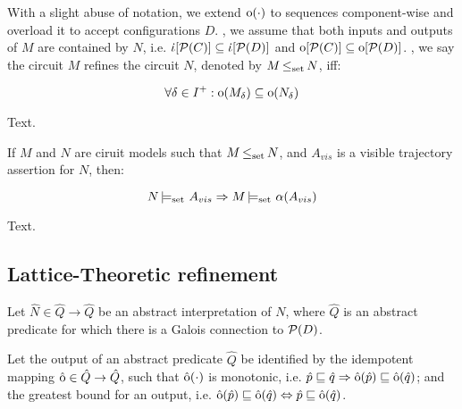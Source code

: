 
With a slight abuse of notation, we extend $\operatorname{\mathrm{o}}(\cdot)$ to sequences component-wise and overload it to accept configurations $D$. , we assume that both inputs and outputs of $M$ are contained by $N$, i.e. $\operatorname{\dot{\iota}}[\mathcal{P}(C)] \subseteq \operatorname{\dot{\iota}}[\mathcal{P}(D)]$ and $\operatorname{\mathrm{o}}[\mathcal{P}(C)] \subseteq \operatorname{\mathrm{o}}[\mathcal{P}(D)]$. , we say the circuit $M$ refines the circuit $N$, denoted by $M \operatorname{\leq_{\textrm{set}}} N$, iff:

\begin{equation*}
\forall \delta \in I^{+} : \operatorname{\mathrm{o}}(M_{\delta}) \subseteq \operatorname{\mathrm{o}}(N_{\delta})
\end{equation*}

Text.

\begin{theorem}
\label{thm:refinement}
If $M$ and $N$ are ciruit models such that $M \operatorname{\leq_{\textrm{set}}} N$, and $A_{vis}$ is a visible trajectory assertion for $N$, then:

\begin{equation*}
N \operatorname{\models_{\textrm{set}}} \, A_{vis} \Rightarrow M \operatorname{\models_{\textrm{set}}} \, \alpha(A_{vis})
\end{equation*}
\end{theorem}

\noindent Text.

\subsection{Lattice-Theoretic refinement}

Let $\hat N \in \hat Q \rightarrow \hat Q$ be an abstract interpretation of $N$, where $\hat Q$ is an abstract predicate for which there is a Galois connection to $\mathcal{P}(D)$.

Let the output of an abstract predicate $\hat Q$ be identified by the idempotent mapping $\operatorname{\hat{\mathrm{o}}} \in \hat Q \rightarrow \hat Q$, such that $\operatorname{\hat{\mathrm{o}}}(\cdot)$ is monotonic, i.e. $\hat p \sqsubseteq \hat q \Rightarrow \operatorname{\hat{\mathrm{o}}}(\hat p) \sqsubseteq \operatorname{\hat{\mathrm{o}}}(\hat q)$; and the greatest bound for an output, i.e. $\operatorname{\hat{\mathrm{o}}}(\hat p) \sqsubseteq \operatorname{\hat{\mathrm{o}}}(\hat q) \Leftrightarrow \hat p \sqsubseteq \operatorname{\hat{\mathrm{o}}}(\hat q)$. 


